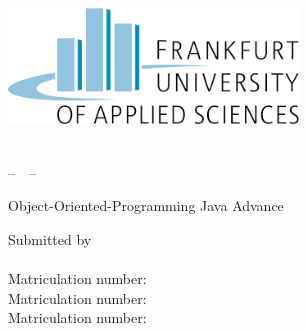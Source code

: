 \thispagestyle{empty}
\begin{titlepage}

  \condTWOSIDE{\changetext{}{19mm}{}{19mm}{}}

  \vspace{1cm}
  \begin{center}
    \includegraphics[width=7.7cm]{gfx/fh_logo.png} \\ 
  \end{center}

  \begin{center}
    \vspace{0.1cm}
    \huge \textbf{\myUni}\\
    \vspace{0.4cm}
    \LARGE --~\myFaculty{}~--
  \end{center}

  \vfill
  \vfill

  \begin{center}
    \LARGE \textbf{\myTitle}
  \end{center} 

  \vfill
  \vfill

  \begin{center}
    \Large Object-Oriented-Programming Java Advance\\
    \vspace{0.3cm}
    \Large \myDegree{}
  \end{center}

  \vfill

  \begin{center}
    \Large Submitted by\\
    \vspace{0.3cm}
    \Large \textbf{\myNameK}\\
    \vspace{0.3cm}
    \normalsize Matriculation number: \myIdK{}
    \vfill
    \vspace{0.3cm}
    \Large \textbf{\myNameM}\\
    \vspace{0.3cm}
    \normalsize Matriculation number: \myIdM{}
    \vfill
    \vspace{0.3cm}
    \Large \textbf{\myNameH}\\
    \vspace{0.3cm}
    \normalsize Matriculation number: \myIdH{}
    \vfill


\end{center}
\end{titlepage}
